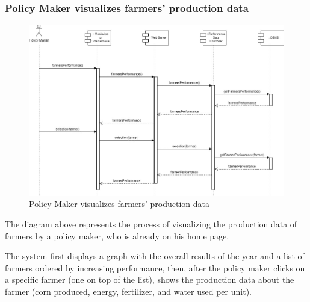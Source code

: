 \documentclass{article}
\begin{document}
    
    \newpage
    
    
    \subsubsection{Policy Maker visualizes farmers' production data}
        \begin{figure} [h]
            \centering
            \includegraphics[width=1\textwidth]{images/ArchitecturalDesign/RuntimeView/12. PolicyMakerVisualizeProductionData.jpg}
            \caption{\label{fig:policyMakerVisualizeProdData}Policy Maker visualizes farmers' production data}
        \end{figure}
        
        The diagram above represents the process of visualizing the production data of farmers by a policy maker, who is already on his home page. \par
        The system first displays a graph with the overall results of the year and a list of farmers ordered by increasing performance, then, after the policy maker clicks on a specific farmer (one on top of the list), shows the production data about the farmer (corn produced, energy, fertilizer, and water used per unit). \par
        
        
    \newpage 
    
    
\end{document}
